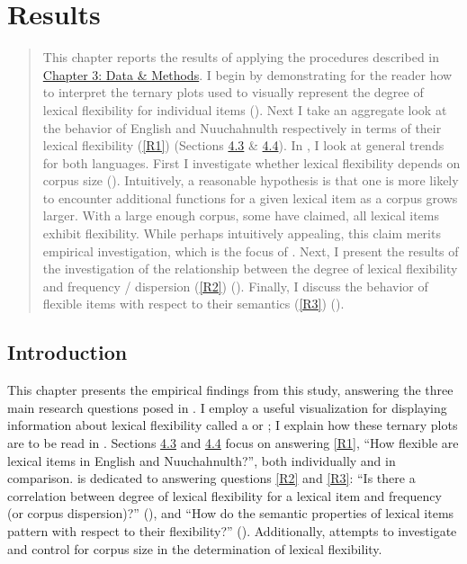\chapter{Results}
\label{ch:results}

\blockquote{This chapter reports the results of applying the procedures described in \hyperref[ch:methods]{Chapter 3: Data \& Methods}. I begin by demonstrating for the reader how to interpret the ternary plots used to visually represent the degree of lexical flexibility for individual items (). Next I take an aggregate look at the behavior of English and Nuuchahnulth respectively in terms of their lexical flexibility (\ref{R1}) (Sections \hyperref[sec:4.3]{4.3} \& \hyperref[sec:4.4]{4.4}). In , I look at general trends for both languages. First I investigate whether lexical flexibility depends on corpus size (). Intuitively, a reasonable hypothesis is that one is more likely to encounter additional functions for a given lexical item as a corpus grows larger. With a large enough corpus, some have claimed, all lexical items exhibit flexibility. While perhaps intuitively appealing, this claim merits empirical investigation, which is the focus of . Next, I present the results of the investigation of the relationship between the degree of lexical flexibility and frequency / dispersion (\ref{R2}) (). Finally, I discuss the behavior of flexible items with respect to their semantics (\ref{R3}) ().}

\section{Introduction}
\label{sec:4.1}

This chapter presents the empirical findings from this study, answering the three main research questions posed in . I employ a useful visualization for displaying information about lexical flexibility called a  or ; I explain how these ternary plots are to be read in . Sections \hyperref[sec:4.3]{4.3} and \hyperref[sec:4.4]{4.4} focus on answering \ref{R1}, \enquote{How flexible are lexical items in English and Nuuchahnulth?}, both individually and in comparison.  is dedicated to answering questions \ref{R2} and \ref{R3}: \enquote{Is there a correlation between degree of lexical flexibility for a lexical item and frequency (or corpus dispersion)?} (), and \enquote{How do the semantic properties of lexical items pattern with respect to their flexibility?} (). Additionally,  attempts to investigate and control for corpus size in the determination of lexical flexibility.


